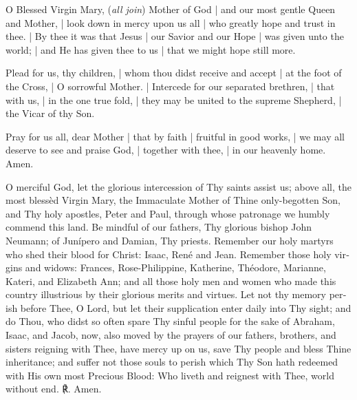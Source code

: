 \documentclass[11pt]{book}
\begin{document}

\begin{otherlanguage}{english}
{\par}



\lettrine{O}{} Blessed Virgin Mary, (\textit{all join}) Mother of God | and our most gentle Queen and Mother, | look down in mercy upon us all | who greatly hope and trust in thee. | By thee it was that Jesus | our Savior and our Hope | was given unto the world; | and He has given thee to us | that we might hope still more.

Plead for us, thy children, | whom thou didst receive and accept | at the foot of the Cross, | O sorrowful Mother. | Intercede for our separated brethren, | that with us, | in the one true fold, | they may be united to the supreme Shepherd, | the Vicar of thy Son.

Pray for us all, dear Mother | that by faith | fruitful in good works, | we may all deserve to see and praise God, | together with thee, | in our heavenly home. Amen.



\lettrine{O}{} merciful God, let the glorious intercession of Thy saints assist us; above all, the most blessèd Virgin Mary, the Immaculate Mother of Thine only-begotten Son, and Thy holy apostles, Peter and Paul, through whose patronage we humbly commend this land. Be mindful of our fathers, Thy glorious bishop John Neumann; of Junípero and Damian, Thy priests. Remember our holy martyrs who shed their blood for Christ: Isaac, René and Jean. Remember those holy virgins and widows: Frances, Rose-Philippine, Katherine, Théodore, Marianne, Kateri, and Elizabeth Ann; and all those holy men and women who made this country illustrious by their glorious merits and virtues. Let not thy memory perish before Thee, O Lord, but let their supplication enter daily into Thy sight; and do Thou, who didst so often spare Thy sinful people for the sake of Abraham, Isaac, and Jacob, now, also moved by the prayers of our fathers, brothers, and sisters reigning with Thee, have mercy up on us, save Thy people and bless Thine inheritance; and suffer not those souls to perish which Thy Son hath redeemed with His own most Precious Blood: Who liveth and reignest with Thee, world without end. ℟. Amen.


\end{otherlanguage}
\end{document}
